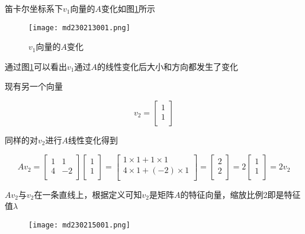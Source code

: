 \documentclass[12pt, a4paper, oneside]{ctexbook}
\begin{document}
笛卡尔坐标系下$v_1$向量的$A$变化如图\ref{md230213001}所示


\begin{figure}[H] 
    \centering %
    \texttt{[image: md230213001.png]}
    \caption{$v_1$向量的$A$变化} %
    \label{md230213001} %
\end{figure}

通过图\ref{md230213001}可以看出$v_1$通过$A$的线性变化后大小和方向都发生了变化

现有另一个向量

$$
v_2=
\left[
    \begin{matrix}
        1 \\ 1 \\
    \end{matrix}
\right]
$$

同样的对$v_2$进行$A$线性变化得到

$$
Av_2=
\left[
    \begin{matrix}
        1 & 1 \\
        4 & -2 \\
    \end{matrix}
\right]
\left[
    \begin{matrix}
        1 \\ 1 \\
    \end{matrix}
\right]=
\left[
    \begin{matrix}
        1 \times 1 + 1 \times 1 \\
        4 \times 1 + (-2) \times 1 \\
    \end{matrix}
\right]=
\left[
    \begin{matrix}
        2 \\ 2 \\
    \end{matrix}
\right]=
2\left[
    \begin{matrix}
        1 \\ 1 \\
    \end{matrix}
\right]=
2v_2
$$

$Av_2$与$v_2$在一条直线上，根据定义可知$v_2$是矩阵$A$的特征向量，缩放比例2即是特征值$\lambda$

\begin{figure}[H]
    \centering
    \texttt{[image: md230215001.png]}
    \label{md230215001}
\end{figure}
\end{document}
